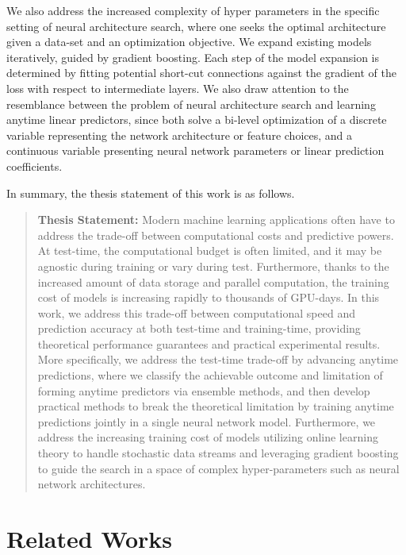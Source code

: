We also address the increased complexity of hyper parameters in the specific setting of neural architecture search, where one seeks the optimal architecture given a data-set and an optimization objective. We expand existing models iteratively, guided by gradient boosting. Each step of the model expansion is determined by fitting potential short-cut connections against the gradient of the loss with respect to intermediate layers. 
We also draw attention to the resemblance between the problem of neural architecture search and learning anytime linear predictors, since both  solve a bi-level optimization of a discrete variable representing the network architecture or feature choices, and a continuous variable presenting neural network parameters or linear prediction coefficients. 

In summary, the thesis statement of this work is as follows. 
\begin{quotation}
\textbf{Thesis Statement:} 
Modern machine learning applications often have to address the trade-off between computational costs and predictive powers. At test-time, the computational budget is often limited, and it may be agnostic during training or vary during test. Furthermore, thanks to the increased amount of data storage and parallel computation, the training cost of models is increasing rapidly to thousands of GPU-days. In this work, we address this trade-off between computational speed and prediction accuracy at both test-time and training-time, providing theoretical performance guarantees and practical experimental results. More specifically, we address the test-time trade-off by advancing anytime predictions, where we classify the achievable outcome and limitation of forming anytime predictors via ensemble methods, and then develop practical methods to break the theoretical limitation by training anytime predictions jointly in a single neural network model. Furthermore, we address the increasing training cost of models utilizing online learning theory to handle stochastic data streams and leveraging gradient boosting to guide the search in a space of complex hyper-parameters such as neural network architectures. 
\end{quotation}



\section{Related Works}
\label{sec:related_works}

